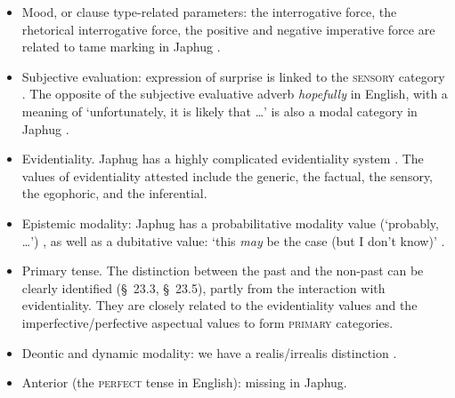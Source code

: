 \documentclass[a4paper, oneside, 12pt]{report}
\newcommand*{\citesec}[1]{\S~{#1}}
\newcommand*{\citetable}[1]{Table~{#1}}
\newcommand{\form}[1]{\emph{#1}}
\newcommand{\category}[1]{\textsc{#1}}
\newcommand{\translate}[1]{`#1'}
\begin{document}
\begin{table}[H]
    \caption{\ac{tame} parameters in Japhug}
    \label{tbl:tame-primitives}
    \begin{itemize}
        \item Mood, or clause type-related parameters:
        the interrogative force, the rhetorical interrogative force,
        the positive and negative imperative force
        are related to \ac{tame} marking in Japhug
        \citep[\citesec{21.4}, \citesec{21.7.3}, \citesec{21.7.4}]{jacques2021grammar}.

        \item Subjective evaluation: 
        expression of surprise is linked to the \category{sensory} category 
        \citep[\citesec{21.3.2.4}]{jacques2021grammar}.
        The opposite of the subjective evaluative adverb \form{hopefully} in English,
        with a meaning of \translate{unfortunately, it is likely that \dots}
        is also a modal category in Japhug \citep[\citesec{21.7.1}]{jacques2021grammar}.

        \item Evidentiality.
        Japhug has a highly complicated evidentiality system 
        \citep[\citetable{31.4}]{jacques2015sketch}.
        The values of evidentiality attested include 
        the generic, the factual, the sensory, the egophoric, and the inferential.
        
        \item Epistemic modality: Japhug has a probabilitative modality value 
        (\translate{probably, \dots})
        \citep[\citesec{21.7.2}]{jacques2021grammar},
        as well as a dubitative value:
        \translate{this \emph{may} be the case (but I don't know)}
        \citep[\citesec{21.4.4}]{jacques2021grammar}.

        \item Primary tense. 
        The distinction between the past and the non-past
        can be clearly identified (\citesec{23.3}, \citesec{23.5}),
        partly from the interaction with evidentiality.
        They are closely related to the evidentiality values
        and the imperfective/perfective aspectual values
        to form \category{primary} categories.
    
        \item Deontic and dynamic modality:
        we have a realis/irrealis distinction \citep[\citesec{21.4.1}]{jacques2021grammar}.
    
        \item Anterior (the \category{perfect} tense in English):
        missing in Japhug.
    

\end{itemize}
\end{table}
\end{document}

